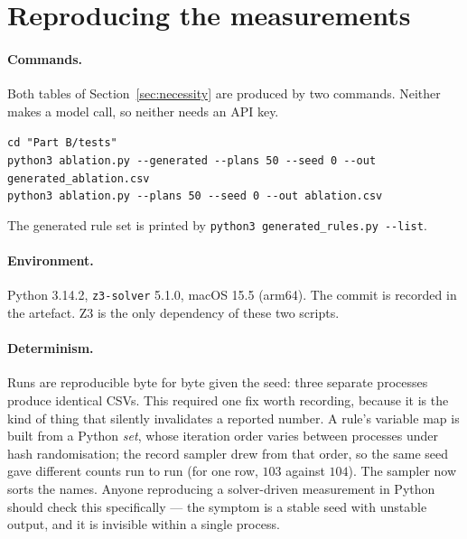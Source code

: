 
\section{Reproducing the measurements}
\label{app:repro}

\paragraph{Commands.}
Both tables of Section~\ref{sec:necessity} are produced by two commands. Neither
makes a model call, so neither needs an API key.
\begin{center}
\texttt{cd "Part B/tests"}\\
\texttt{python3 ablation.py -{}-generated -{}-plans 50 -{}-seed 0 -{}-out generated\_ablation.csv}\\
\texttt{python3 ablation.py -{}-plans 50 -{}-seed 0 -{}-out ablation.csv}
\end{center}
The generated rule set is printed by
\texttt{python3 generated\_rules.py -{}-list}.

\paragraph{Environment.}
Python 3.14.2, \texttt{z3-solver} 5.1.0, macOS 15.5 (arm64). The commit is
recorded in the artefact. Z3 is the only dependency of these two scripts.

\paragraph{Determinism.}
Runs are reproducible byte for byte given the seed: three separate processes
produce identical CSVs. This required one fix worth recording, because it is
the kind of thing that silently invalidates a reported number. A rule's
variable map is built from a Python \emph{set}, whose iteration order varies
between processes under hash randomisation; the record sampler drew from that
order, so the same seed gave different counts run to run (for one row, $103$
against $104$). The sampler now sorts the names. Anyone reproducing a
solver-driven measurement in Python should check this specifically --- the
symptom is a stable seed with unstable output, and it is invisible within a
single process.


